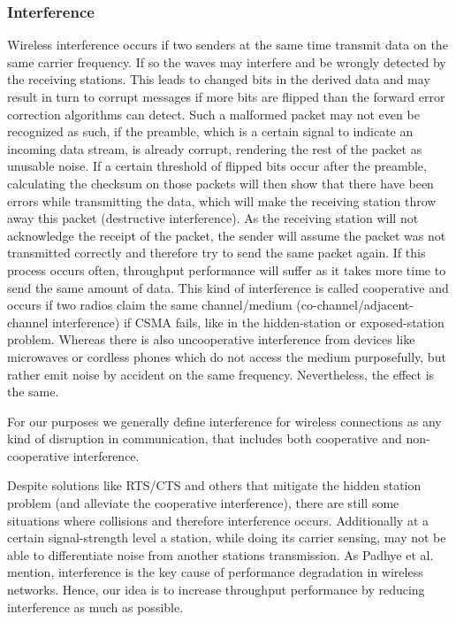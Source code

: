       \subsubsection{Interference}
	Wireless interference occurs if two senders at the same time transmit data on the same carrier frequency. If so the waves may interfere and be wrongly detected
	by the receiving stations. This leads to changed bits in the derived data and may result in turn to corrupt messages if more bits are flipped than the
	forward error correction algorithms can detect. Such a malformed packet may not even be recognized as such, if the preamble, which is a certain signal to indicate an
	incoming data stream, is already corrupt, rendering the rest of the packet as unusable noise. If a certain threshold of flipped bits occur after the preamble,
	calculating the checksum on those packets will then show that there have been errors while transmitting the data, which will make the receiving station 
	throw away this packet (destructive interference).
	As the receiving station will not acknowledge the receipt of the packet, the sender will assume the packet was not transmitted correctly and therefore try 
	to send the same packet again. If this process occurs often, throughput performance will suffer as it takes more time to send the same amount of data.
	This kind of interference is called cooperative and occurs if two radios claim the same channel/medium (co-channel/adjacent-channel interference) if CSMA fails,
	like in the hidden-station or exposed-station problem.
	Whereas there is also uncooperative interference from devices like microwaves or cordless phones which do not access the medium purposefully, but rather
	emit noise by accident on the same frequency. Nevertheless, the effect is the same.
	
	For our purposes we generally define interference for wireless connections as any kind of disruption in communication, 
	that includes both cooperative and non-cooperative interference.
	
	Despite solutions like RTS/CTS and others that mitigate the hidden station problem (and alleviate the cooperative interference),
	there are still some situations where collisions and therefore interference occurs.
	Additionally at a certain signal-strength level a station, while doing its carrier sensing, may not be able to differentiate noise from another stations transmission.
	As Padhye et al.\cite{padhye2005estimation} mention, interference is the key cause of performance degradation in wireless networks. Hence, our idea is to increase throughput 
	performance by reducing interference as much as possible.
	
